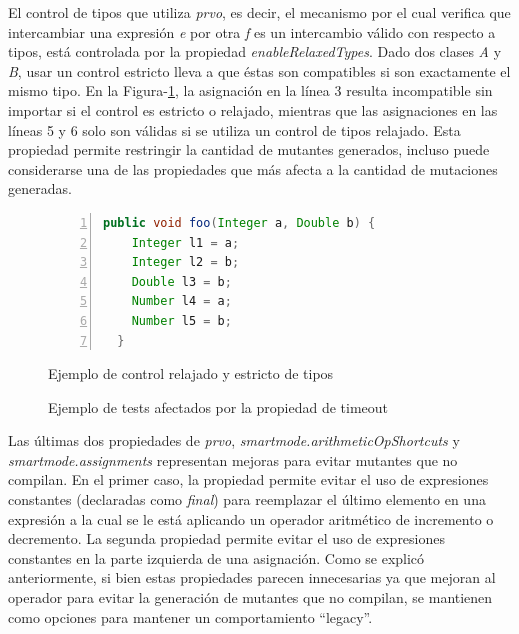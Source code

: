 El control de tipos que utiliza \emph{prvo}, es decir, el mecanismo por el cual verifica que intercambiar una expresi\'on \emph{e} por otra \emph{f} es un intercambio v\'alido con respecto a tipos, est\'a controlada por la propiedad \emph{enableRelaxedTypes}. Dado dos clases \emph{A} y \emph{B}, usar un control estricto lleva a que \'estas son compatibles si son exactamente el mismo tipo. En la Figura-\ref{figures.examples.operators.prvo.relaxedVsStrict}, la asignaci\'on en la l\'inea 3 resulta incompatible sin importar si el control es estricto o relajado, mientras que las asignaciones en las l\'ineas 5 y 6 solo son v\'alidas si se utiliza un control de tipos relajado. Esta propiedad permite restringir la cantidad de mutantes generados, incluso puede considerarse una de las propiedades que m\'as afecta a la cantidad de mutaciones generadas.

\begin{figure}
	\begin{lstlisting}[mathescape=true,language=Java,numbers=left]
  public void foo(Integer a, Double b) {
    Integer l1 = a;
    Integer l2 = b;
    Double l3 = b;
    Number l4 = a;
    Number l5 = b;
  }
	\end{lstlisting}
	\caption{Ejemplo de control relajado y estricto de tipos}
	\label{figures.examples.operators.prvo.relaxedVsStrict}
\end{figure}

\begin{figure}
	
	\caption{Ejemplo de tests afectados por la propiedad de timeout}
	\label{figures.examples.confFile.testTimeout}
\end{figure}

Las \'ultimas dos propiedades de \emph{prvo}, \emph{smartmode.arithmeticOpShortcuts} y \emph{smartmode.assignments} representan mejoras para evitar mutantes que no compilan. En el primer caso, la propiedad permite evitar el uso de expresiones constantes (declaradas como \emph{final}) para reemplazar el \'ultimo elemento en una expresi\'on a la cual se le est\'a aplicando un operador aritm\'etico de incremento o decremento. La segunda propiedad permite evitar el uso de expresiones constantes en la parte izquierda de una asignaci\'on. Como se explic\'o anteriormente, si bien estas propiedades parecen innecesarias ya que mejoran al operador para evitar la generaci\'on de mutantes que no compilan, se mantienen como opciones para mantener un comportamiento ``legacy''.

